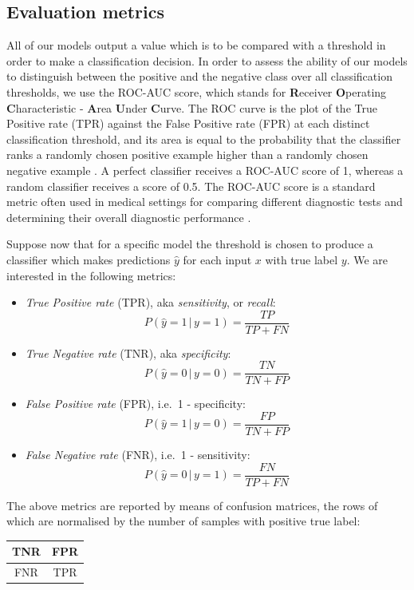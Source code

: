 \documentclass[a4paper,10pt]{article}
\begin{document}
\subsection{Evaluation metrics}

All of our models output a value which is to be compared with a threshold in order to make a classification decision. In order to assess the ability of our models to distinguish between the positive and the negative class over all classification thresholds, we use the ROC-AUC score, which stands for \textbf{R}eceiver \textbf{O}perating \textbf{C}haracteristic - \textbf{A}rea \textbf{U}nder \textbf{C}urve. The ROC curve is the plot of the True Positive rate (TPR) against the False Positive rate (FPR) at each distinct classification threshold, and its area is equal to the probability that the classifier ranks a randomly chosen positive example higher than a randomly chosen negative example \cite{roc}. A perfect classifier receives a ROC-AUC score of 1, whereas a random classifier receives a score of 0.5. The ROC-AUC score is a standard metric often used in medical settings for comparing different diagnostic tests and determining their overall diagnostic performance \cite{rocmedicine}.

Suppose now that for a specific model the threshold is chosen to produce a classifier which makes predictions $\hat{y}$ for each input $x$ with true label $y$. We are interested in the following metrics:
\begin{itemize}
	\item \emph{True Positive rate} (TPR), aka \emph{sensitivity}, or \emph{recall}:
	      \[
		      P(\hat{y} = 1 \,|\, y = 1) = \frac{TP}{TP + FN}
	      \]
	\item \emph{True Negative rate} (TNR), aka \emph{specificity}:
	      \[
		      P(\hat{y} = 0 \,|\, y = 0) = \frac{TN}{TN + FP}
	      \]
	\item \emph{False Positive rate} (FPR), i.e.\ 1 - specificity:
	      \[
		      P(\hat{y} = 1 \,|\, y = 0) = \frac{FP}{TN + FP}
	      \]
	\item \emph{False Negative rate} (FNR), i.e.\ 1 - sensitivity:
	      \[
		      P(\hat{y} = 0 \,|\, y = 1) = \frac{FN}{TP + FN}
	      \]
\end{itemize}
The above metrics are reported by means of confusion matrices, the rows of which are normalised by the number of samples with positive true label:
\begin{table}[H]
	\centering
	\begin{tabular}{c|c}
		TNR & FPR \\\midrule
		FNR & TPR
	\end{tabular}
\end{table}
\end{document}
